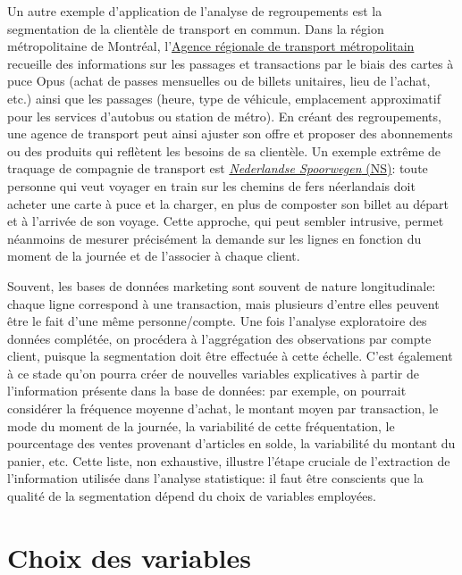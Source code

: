 \documentclass[
  11pt,
  letterpaper,
]{book}
\theoremstyle{definition}
\theoremstyle{remark}
\begin{document}
Un autre exemple d'application de l'analyse de regroupements est la
segmentation de la clientèle de transport en commun. Dans la région
métropolitaine de Montréal, l'\href{https://www.artm.quebec/}{Agence
régionale de transport métropolitain} recueille des informations sur les
passages et transactions par le biais des cartes à puce Opus (achat de
passes mensuelles ou de billets unitaires, lieu de l'achat, etc.) ainsi
que les passages (heure, type de véhicule, emplacement approximatif pour
les services d'autobus ou station de métro). En créant des
regroupements, une agence de transport peut ainsi ajuster son offre et
proposer des abonnements ou des produits qui reflètent les besoins de sa
clientèle. Un exemple extrême de traquage de compagnie de transport est
\href{https://www.ns.nl/en/}{\emph{Nederlandse Spoorwegen} (NS)}: toute
personne qui veut voyager en train sur les chemins de fers néerlandais
doit acheter une carte à puce et la charger, en plus de composter son
billet au départ et à l'arrivée de son voyage. Cette approche, qui peut
sembler intrusive, permet néanmoins de mesurer précisément la demande
sur les lignes en fonction du moment de la journée et de l'associer à
chaque client.

Souvent, les bases de données marketing sont souvent de nature
longitudinale: chaque ligne correspond à une transaction, mais plusieurs
d'entre elles peuvent être le fait d'une même personne/compte. Une fois
l'analyse exploratoire des données complétée, on procédera à
l'aggrégation des observations par compte client, puisque la
segmentation doit être effectuée à cette échelle. C'est également à ce
stade qu'on pourra créer de nouvelles variables explicatives à partir de
l'information présente dans la base de données: par exemple, on pourrait
considérer la fréquence moyenne d'achat, le montant moyen par
transaction, le mode du moment de la journée, la variabilité de cette
fréquentation, le pourcentage des ventes provenant d'articles en solde,
la variabilité du montant du panier, etc. Cette liste, non exhaustive,
illustre l'étape cruciale de l'extraction de l'information utilisée dans
l'analyse statistique: il faut être conscients que la qualité de la
segmentation dépend du choix de variables employées.

\hypertarget{choix-des-variables}{%
\section{Choix des variables}\label{choix-des-variables}}
\end{document}

